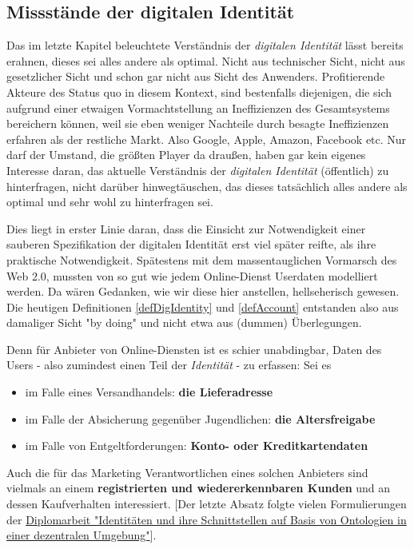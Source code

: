 \subsection{Missstände der digitalen Identität}
\label{sec:einleitung_probleme_digitaler_identitaet}

\vspace{0.3cm}

Das im letzte Kapitel beleuchtete Verständnis der \textit{digitalen Identität} lässt bereits erahnen, dieses sei alles andere als optimal. Nicht aus technischer Sicht, nicht aus gesetzlicher Sicht und schon gar nicht aus Sicht des Anwenders. Profitierende Akteure des Status quo in diesem Kontext, sind bestenfalls diejenigen, die sich aufgrund einer etwaigen Vormachtstellung an Ineffizienzen des Gesamtsystems bereichern können, weil sie eben weniger Nachteile durch besagte Ineffizienzen erfahren als der restliche Markt. Also Google, Apple, Amazon, Facebook etc. Nur darf der Umstand, die größten Player da draußen, haben gar kein eigenes Interesse daran, das aktuelle Verständnis der \textit{digitalen Identität} (öffentlich) zu hinterfragen, nicht darüber hinwegtäuschen, das dieses tatsächlich alles andere als optimal und sehr wohl zu hinterfragen sei.

Dies liegt in erster Linie daran, dass die Einsicht zur Notwendigkeit einer sauberen Spezifikation der digitalen Identität erst viel später reifte, als ihre praktische Notwendigkeit. Spätestens mit dem massentauglichen Vormarsch des Web 2.0, mussten von so gut wie jedem Online-Dienst Userdaten modelliert werden. Da wären Gedanken, wie wir diese hier anstellen, hellseherisch gewesen. Die heutigen Definitionen \ref{defDigIdentity} und \ref{defAccount} entstanden also aus damaliger Sicht "by doing" und nicht etwa aus (dummen) Überlegungen.

\vspace{0.1cm}

Denn für Anbieter von Online-Diensten ist es schier unabdingbar, Daten des Users - also zumindest einen Teil der \textit{Identität} - zu erfassen: Sei es 

\begin{itemize}
  \item im Falle eines Versandhandels: \textbf{die Lieferadresse}
  \item im Falle der Absicherung gegenüber Jugendlichen: \textbf{die Altersfreigabe}
  \item im Falle von Entgeltforderungen: \textbf{Konto- oder Kreditkartendaten}
\end{itemize}
Auch die für das Marketing Verantwortlichen eines solchen Anbieters sind vielmals an einem \textbf{registrierten und wiedererkennbaren Kunden} und an dessen Kaufverhalten interessiert. [Der letzte Absatz folgte vielen Formulierungen der \href{https://vsis-www.informatik.uni-hamburg.de/getDoc.php/thesis/47/DA_Gordian_Kaulbarsch.pdf}{Diplomarbeit "Identitäten und ihre Schnittstellen auf Basis von Ontologien in einer dezentralen Umgebung"}]. 

